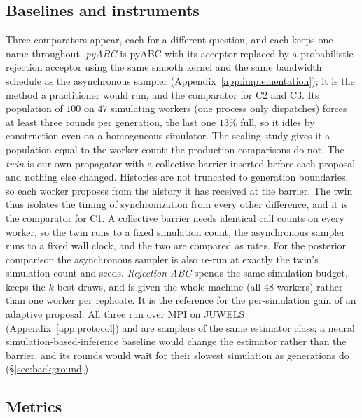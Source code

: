 \documentclass[10pt]{article}
\theoremstyle{plain}
\theoremstyle{definition}
\begin{document}
\subsection{Baselines and instruments}\label{sec:experiments-baselines}\label{sec:implementation}
Three comparators appear, each for a different question, and each keeps one name throughout. \emph{pyABC} is pyABC \citep{klinger2018pyabc,schalte2022pyabc} with its acceptor replaced by a probabilistic-rejection acceptor using the same smooth kernel and the same bandwidth schedule as the asynchronous sampler (Appendix~\ref{app:implementation}); it is the method a practitioner would run, and the comparator for C2 and C3. Its population of $100$ on $47$ simulating workers (one process only dispatches) forces at least three rounds per generation, the last one $13\%$ full, so it idles by construction even on a homogeneous simulator. The scaling study gives it a population equal to the worker count; the production comparisons do not. The \emph{twin} is our own propagator with a collective barrier inserted before each proposal and nothing else changed. Histories are not truncated to generation boundaries, so each worker proposes from the history it has received at the barrier. The twin thus isolates the timing of synchronization from every other difference, and it is the comparator for C1. A collective barrier needs identical call counts on every worker, so the twin runs to a fixed simulation count, the asynchronous sampler runs to a fixed wall clock, and the two are compared as rates. For the posterior comparison the asynchronous sampler is also re-run at exactly the twin's simulation count and seeds. \emph{Rejection ABC} spends the same simulation budget, keeps the $k$ best draws, and is given the whole machine (all $48$ workers) rather than one worker per replicate. It is the reference for the per-simulation gain of an adaptive proposal. All three run over MPI on JUWELS (Appendix~\ref{app:protocol}) and are samplers of the same estimator class; a neural simulation-based-inference baseline would change the estimator rather than the barrier, and its rounds would wait for their slowest simulation as generations do (\S\ref{sec:background}).

\subsection{Metrics}\label{sec:experiments-metrics}
\end{document}
